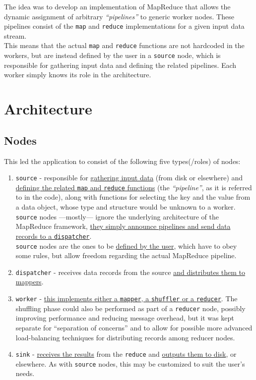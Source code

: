 The idea was to develop an implementation of MapReduce that allows the dynamic assignment of arbitrary \textit{``pipelines''} to generic worker nodes. These pipelines consist of the \lstinline|map| and \lstinline|reduce| implementations for a given input data stream.\\
This means that the actual \lstinline|map| and \lstinline|reduce| functions are not hardcoded in the workers, but are instead defined by the user in a \texttt{source} node, which is responsible for gathering input data and defining the related pipelines.
Each worker simply knows its role in the architecture.

\section{Architecture}

\subsection{Nodes}
This led the application to consist of the following five types(/roles) of nodes:
\begin{enumerate}
   \item \texttt{source} - responsible for \ul{gathering input data} (from disk or elsewhere) and \ul{defining the related \texttt{map} and \texttt{reduce} functions} (the \textit{``pipeline''}, as it is referred to in the code), along with functions for selecting the key and the value from a data object, whose type and structure would be unknown to a worker.\\
   \texttt{source} nodes ---mostly--- ignore the underlying architecture of the MapReduce framework, \ul{they simply announce pipelines and send data records to a \texttt{dispatcher}}.\\
   \texttt{source} nodes are the ones to be \ul{defined by the user}, which have to obey some rules, but allow freedom regarding the actual MapReduce pipeline.
   \item \texttt{dispatcher} - receives data records from the source \ul{and distributes them to mappers}.
   \item \texttt{worker} - \ul{this implements either a \texttt{mapper}, a \texttt{shuffler} or a \texttt{reducer}}. The shuffling phase could also be performed as part of a \texttt{reducer} node, possibly improving performance and reducing message overhead, but it was kept separate for ``separation of concerns'' and to allow for possible more advanced load-balancing techniques for distributing records among reducer nodes.
   \item \texttt{sink} - \ul{receives the results} from the \texttt{reduce} and \ul{outputs them to disk}, or elsewhere. As with \texttt{source} nodes, this may be customized to suit the user's needs.
\end{enumerate}

